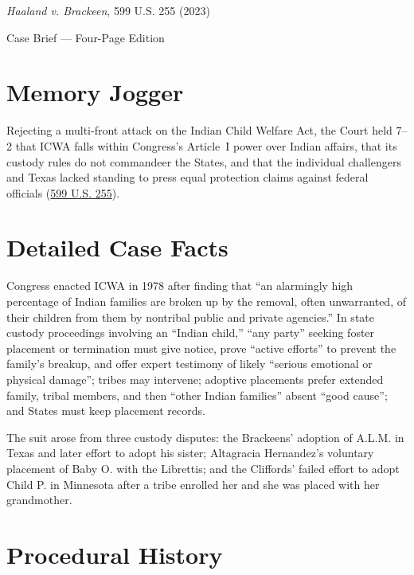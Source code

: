 \documentclass[12pt]{article}
\begin{document}
\begin{center}
{\LARGE \textit{Haaland v. Brackeen}, 599 U.S. 255 (2023)\par}
\vspace{0.8em}
{\large Case Brief --- Four-Page Edition\par}
\end{center}
\vspace{1em}

\section{Memory Jogger}

Rejecting a multi-front attack on the Indian Child Welfare Act, the Court held 7--2 that ICWA falls within Congress's Article~I power over Indian affairs, that its custody rules do not commandeer the States, and that the individual challengers and Texas lacked standing to press equal protection claims against federal officials (\href{https://supreme.justia.com/cases/federal/us/599/21-376/}{599 U.S. 255}).

\section{Detailed Case Facts}

Congress enacted ICWA in 1978 after finding that ``an alarmingly high percentage of Indian families are broken up by the removal, often unwarranted, of their children from them by nontribal public and private agencies.'' In state custody proceedings involving an ``Indian child,'' ``any party'' seeking foster placement or termination must give notice, prove ``active efforts'' to prevent the family's breakup, and offer expert testimony of likely ``serious emotional or physical damage''; tribes may intervene; adoptive placements prefer extended family, tribal members, and then ``other Indian families'' absent ``good cause''; and States must keep placement records.

The suit arose from three custody disputes: the Brackeens' adoption of A.L.M. in Texas and later effort to adopt his sister; Altagracia Hernandez's voluntary placement of Baby O. with the Librettis; and the Cliffords' failed effort to adopt Child P. in Minnesota after a tribe enrolled her and she was placed with her grandmother.

\section{Procedural History}
\end{document}
